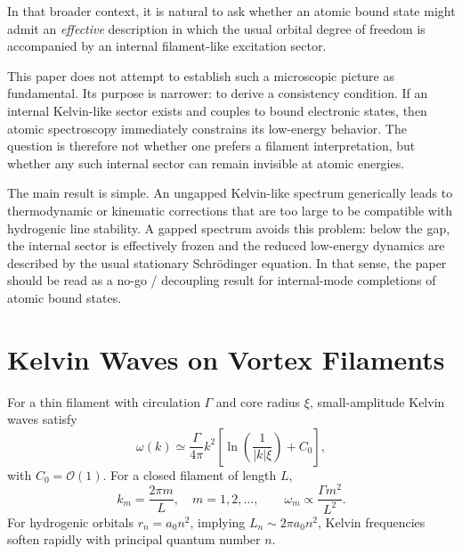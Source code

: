 \documentclass[pdflatex,sn-mathphys-num]{sn-jnl}
\begin{document}
        In that broader context, it is natural to ask whether an atomic bound state might admit an \emph{effective} description in which the usual orbital degree of freedom is accompanied by an internal filament-like excitation sector.

        This paper does not attempt to establish such a microscopic picture as fundamental. Its purpose is narrower: to derive a consistency condition. If an internal Kelvin-like sector exists and couples to bound electronic states, then atomic spectroscopy immediately constrains its low-energy behavior. The question is therefore not whether one prefers a filament interpretation, but whether any such internal sector can remain invisible at atomic energies.

        The main result is simple. An ungapped Kelvin-like spectrum generically leads to thermodynamic or kinematic corrections that are too large to be compatible with hydrogenic line stability. A gapped spectrum avoids this problem: below the gap, the internal sector is effectively frozen and the reduced low-energy dynamics are described by the usual stationary Schr\"odinger equation. In that sense, the paper should be read as a no-go / decoupling result for internal-mode completions of atomic bound states.

    \section{Kelvin Waves on Vortex Filaments}\label{sec:kelvin}
        For a thin filament with circulation $\Gamma$ and core radius $\xi$, small-amplitude Kelvin waves satisfy \cite{LordKelvin1880,Barenghi2014}
        \begin{equation}
            \omega(k) \simeq \frac{\Gamma}{4\pi} k^2
            \left[
                \ln\!\left(\frac{1}{|k|\xi}\right) + C_0
            \right],
            \label{eq:kelvin_dispersion}
        \end{equation}
        with $C_0=\mathcal{O}(1)$. For a closed filament of length $L$,
        \begin{equation}
            k_m = \frac{2\pi m}{L}, \quad m=1,2,\dots,\qquad
            \omega_m \propto \frac{\Gamma m^2}{L^2}.
        \end{equation}
        For hydrogenic orbitals $r_n=a_0 n^2$, implying $L_n\sim 2\pi a_0 n^2$, Kelvin frequencies soften rapidly with principal quantum number $n$.

\end{document}
